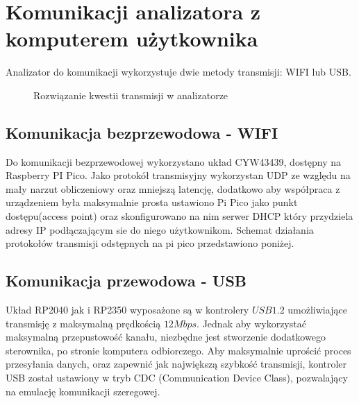 \section{Komunikacji analizatora z komputerem użytkownika}
Analizator do komunikacji wykorzystuje dwie metody transmisji: WIFI lub USB.

\begin{figure}[ht]
    \centering
    \caption{Rozwiązanie kwestii transmisji w analizatorze}
    \label{fig:udp-komunikacja}
\end{figure}

\subsection{Komunikacja bezprzewodowa - WIFI}
    Do komunikacji bezprzewodowej wykorzystano układ CYW43439, dostępny na Raspberry PI Pico. 
    Jako protokół transmisyjny wykorzystan UDP ze względu na mały narzut
    obliczeniowy oraz mniejszą latencję, dodatkowo aby współpraca z urządzeniem była maksymalnie prosta ustawiono Pi Pico
    jako punkt dostępu(access point) oraz skonfigurowano na nim serwer DHCP który przydziela adresy
    IP podłączającym sie do niego użytkownikom. Schemat działania protokołów transmisji
    odstępnych na pi pico przedstawiono poniżej.


\subsection{Komunikacja przewodowa - USB}
    Układ RP2040 jak i RP2350 wyposażone są w kontrolery $USB 1.2$ umożliwiające transmisję z maksymalną prędkością $12Mbps$.
    Jednak aby wykorzystać maksymalną przepustowość kanału, niezbędne jest stworzenie dodatkowego sterownika, po stronie komputera odbiorczego.
    Aby maksymalnie uprościć proces przesyłania danych, oraz zapewnić jak największą szybkość transmisji, kontroler USB został ustawiony w tryb CDC (Communication Device Class),
    pozwalający na emulację komunikacji szeregowej.

